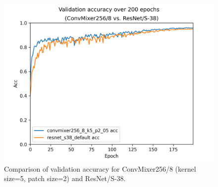 \documentclass[letterpaper]{article} %
\begin{document}
  \begin{figure}
    \includegraphics[width=\linewidth]{final_validation.png}
    \caption{Comparison of validation accuracy for ConvMixer256/8 (kernel size=5, patch size=2) and ResNet/S-38.}
  \end{figure}

\appendix


\end{document}

